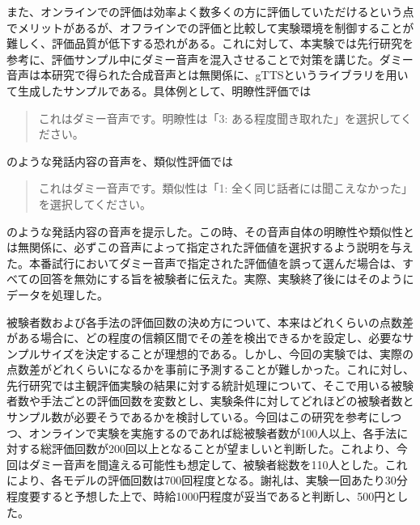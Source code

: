 \documentclass[12pt]{jarticle}
\numberwithin{equation}{section}    %
\numberwithin{figure}{section}      %
\numberwithin{table}{section}      %
\begin{document}
また、オンラインでの評価は効率よく数多くの方に評価していただけるという点でメリットがあるが、オフラインでの評価と比較して実験環境を制御することが難しく、評価品質が低下する恐れがある。これに対して、本実験では先行研究\cite{kirkland2023stuck}を参考に、評価サンプル中にダミー音声を混入させることで対策を講じた。ダミー音声は本研究で得られた合成音声とは無関係に、gTTSというライブラリを用いて生成したサンプルである。具体例として、明瞭性評価では
\begin{quote}
    これはダミー音声です。明瞭性は「3: ある程度聞き取れた」を選択してください。
\end{quote}
のような発話内容の音声を、類似性評価では
\begin{quote}
    これはダミー音声です。類似性は「1: 全く同じ話者には聞こえなかった」を選択してください。
\end{quote}
のような発話内容の音声を提示した。この時、その音声自体の明瞭性や類似性とは無関係に、必ずこの音声によって指定された評価値を選択するよう説明を与えた。本番試行においてダミー音声で指定された評価値を誤って選んだ場合は、すべての回答を無効にする旨を被験者に伝えた。実際、実験終了後にはそのようにデータを処理した。

被験者数および各手法の評価回数の決め方について、本来はどれくらいの点数差がある場合に、どの程度の信頼区間でその差を検出できるかを設定し、必要なサンプルサイズを決定することが理想的である。しかし、今回の実験では、実際の点数差がどれくらいになるかを事前に予測することが難しかった。これに対し、先行研究\cite{wester2015we}では主観評価実験の結果に対する統計処理について、そこで用いる被験者数や手法ごとの評価回数を変数とし、実験条件に対してどれほどの被験者数とサンプル数が必要そうであるかを検討している。今回はこの研究を参考にしつつ、オンラインで実験を実施するのであれば総被験者数が100人以上、各手法に対する総評価回数が200回以上となることが望ましいと判断した。これより、今回はダミー音声を間違える可能性も想定して、被験者総数を110人とした。これにより、各モデルの評価回数は700回程度となる。謝礼は、実験一回あたり30分程度要すると予想した上で、時給1000円程度が妥当であると判断し、500円とした。
\end{document}

